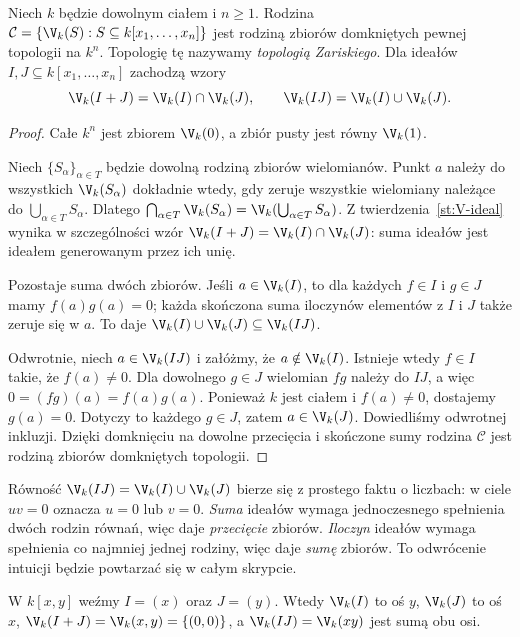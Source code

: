 \begin{twierdzenie}
\label{tw:zariski-top}
Niech $k$ będzie dowolnym ciałem i $n\ge1$.
Rodzina $\mathcal C=\{\V_k(S):S\subseteq k[x_1,\dots,x_n]\}$
jest rodziną zbiorów domkniętych pewnej topologii na $k^n$.
Topologię tę nazywamy \emph{topologią Zariskiego}.
Dla ideałów $I,J\subseteq k[x_1,\dots,x_n]$ zachodzą wzory
\[
\V_k(I+J)=\V_k(I)\cap\V_k(J),\qquad
\V_k(IJ)=\V_k(I)\cup\V_k(J).
\]
\end{twierdzenie}
\begin{proof}
Całe $k^n$ jest zbiorem $\V_k(0)$, a zbiór pusty jest równy
$\V_k(1)$.

Niech $\{S_\alpha\}_{\alpha\in T}$ będzie dowolną rodziną zbiorów
wielomianów. Punkt $a$ należy do wszystkich $\V_k(S_\alpha)$
dokładnie wtedy, gdy zeruje wszystkie wielomiany należące do
$\bigcup_{\alpha\in T}S_\alpha$. Dlatego
$\bigcap_{\alpha\in T}\V_k(S_\alpha)=
\V_k(\bigcup_{\alpha\in T}S_\alpha)$.
Z twierdzenia~\ref{st:V-ideal} wynika w szczególności wzór
$\V_k(I+J)=\V_k(I)\cap\V_k(J)$: suma ideałów jest ideałem
generowanym przez ich unię.

Pozostaje suma dwóch zbiorów. Jeśli $a\in\V_k(I)$, to dla
każdych $f\in I$ i $g\in J$ mamy $f(a)g(a)=0$; każda
skończona suma iloczynów elementów z $I$ i $J$ także zeruje się w $a$.
To daje $\V_k(I)\cup\V_k(J)\subseteq\V_k(IJ)$.

Odwrotnie, niech $a\in\V_k(IJ)$ i załóżmy, że
$a\notin\V_k(I)$. Istnieje wtedy $f\in I$ takie, że
$f(a)\ne0$. Dla dowolnego $g\in J$ wielomian $fg$ należy do
$IJ$, a więc $0=(fg)(a)=f(a)g(a)$. Ponieważ $k$ jest ciałem
i $f(a)\ne0$, dostajemy $g(a)=0$. Dotyczy to każdego $g\in J$,
zatem $a\in\V_k(J)$. Dowiedliśmy odwrotnej inkluzji.
Dzięki domknięciu na dowolne przecięcia i skończone sumy
rodzina $\mathcal C$ jest rodziną zbiorów domkniętych topologii.
\end{proof}

\begin{uwaga}
Równość $\V_k(IJ)=\V_k(I)\cup\V_k(J)$ bierze się z prostego
faktu o liczbach: w ciele $uv=0$ oznacza $u=0$ lub $v=0$.
\emph{Suma} ideałów wymaga jednoczesnego spełnienia dwóch rodzin
równań, więc daje \emph{przecięcie} zbiorów. \emph{Iloczyn} ideałów
wymaga spełnienia co najmniej jednej rodziny, więc daje \emph{sumę}
zbiorów. To odwrócenie intuicji będzie powtarzać się w całym skrypcie.
\end{uwaga}

\begin{przyklad}
W $k[x,y]$ weźmy $I=(x)$ oraz $J=(y)$.
Wtedy $\V_k(I)$ to oś $y$, $\V_k(J)$ to oś $x$,
$\V_k(I+J)=\V_k(x,y)=\{(0,0)\}$, a
$\V_k(IJ)=\V_k(xy)$ jest sumą obu osi.
\end{przyklad}

